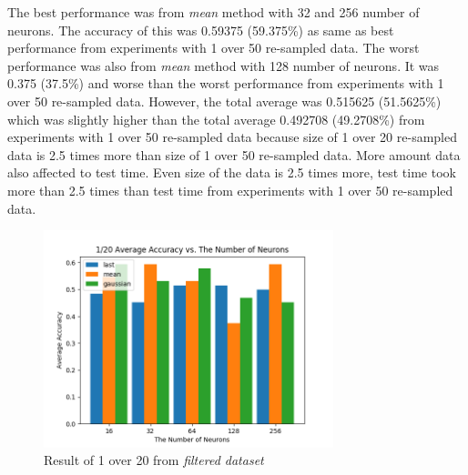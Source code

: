 \documentclass[draft,dvipsnames]{drexel-thesis}
\begin{document}
\begin{thesis}
The best performance was from {\em mean} method with 32 and 256 number of neurons. The accuracy of this was 0.59375 (59.375\%) as same as best performance from experiments with 1 over 50 re-sampled data. The worst performance was also from {\em mean} method with 128 number of neurons. It was 0.375 (37.5\%) and worse than the worst performance from experiments with 1 over 50 re-sampled data. However, the total average was 0.515625 (51.5625\%) which was slightly higher than the total average 0.492708 (49.2708\%) from experiments with 1 over 50 re-sampled data because size of 1 over 20 re-sampled data is 2.5 times more than size of 1 over 50 re-sampled data. More amount data also affected to test time. Even size of the data is 2.5 times more, test time took more than 2.5 times than test time from experiments with 1 over 50 re-sampled data.

\begin{figure}[t!]
    \centering
    \includegraphics[width=0.75\textwidth]{pictures/result_pictures/filtered_1_20_result.png}
    \caption{Result of 1 over 20 from {\em filtered dataset}}
    \label{fig:filter_1_20}
\end{figure}


\end{thesis}
\end{document}
